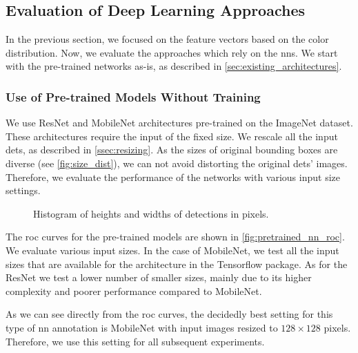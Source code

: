 \subsection{Evaluation of Deep Learning Approaches}

In the previous section, we focused on the feature vectors based on the color distribution. Now, we evaluate the approaches which rely on the \glspl{nn}. We start with the pre-trained networks as-is, as described in \autoref{sec:existing_architectures}.

\subsubsection{Use of Pre-trained Models Without Training}


We use ResNet and MobileNet architectures
pre-trained on the ImageNet dataset. These architectures
require the input of the fixed size. We rescale all the input \glspl{det}, as described in \autoref{ssec:resizing}. As the sizes of original bounding boxes are diverse (see
\autoref{fig:size_dist}), we can not avoid distorting the original \glspl{det}' images.
Therefore, we evaluate the performance of the networks with various input size settings.

\begin{figure}
    \centering
    \def\svgwidth{\columnwidth}
    
    \caption{Histogram of heights and widths of detections in pixels.}
    \label{fig:size_dist}
\end{figure}

The \gls{roc} curves for the pre-trained models are shown in \autoref{fig:pretrained_nn_roc}.
We evaluate various input sizes. In the case of MobileNet, we test
all the input sizes that are available for the architecture in the Tensorflow package. As for the 
ResNet we test a lower number of smaller sizes, mainly due to its higher
complexity and poorer performance compared to MobileNet.

As we can see directly from the \gls{roc} curves, the decidedly best setting for this type of \gls{nn} annotation is MobileNet with input images resized to $128 \times 128$ pixels. Therefore, we use this setting for all subsequent experiments.

